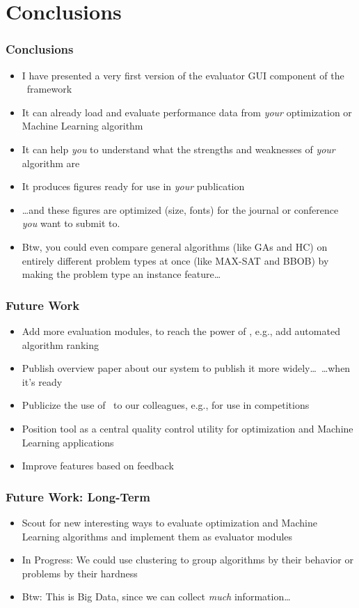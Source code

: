 %
\section{Conclusions}%
%
\begin{frame}%
\frametitle{Conclusions}%
\begin{itemize}%
\item I have presented a very first version of the evaluator GUI component of the \optimizationBenchmarking\ framework%
\item<2-> It can already load and evaluate performance data from \emph{your} optimization or Machine Learning algorithm%
\item<3-> It can help \emph{you} to understand what the strengths and weaknesses of \emph{your} algorithm are%
\item<4-> It produces figures ready for use in \emph{your} publication%
\item<5-> {\dots}and these figures are optimized (size, fonts) for the journal or conference \emph{you} want to submit to.%
\item<6-> Btw, you could even compare general algorithms (like GAs and HC) on entirely different problem types at once (like MAX-SAT and BBOB) by making the problem type an instance feature\dots%
\end{itemize}%
\end{frame}
%
%
\begin{frame}%
\frametitle{Future Work}%
\begin{itemize}%
\item Add more evaluation modules, to reach the power of \tspSuite\expandafter\scitep{\tspSuiteReferences}, e.g., add automated algorithm ranking%
\item<2-> Publish overview paper about our system to publish it more widely\dots\ {\dots}when it's ready%
\item<3-> Publicize the use of \optimizationBenchmarking\ to our colleagues, e.g., for use in competitions%
\item<4-> Position tool as a central quality control utility for optimization and Machine Learning applications%
\item<5-> Improve features based on feedback%
\end{itemize}%
\end{frame}
%
\begin{frame}%
\frametitle{Future Work: Long-Term}%
\begin{itemize}%
\item Scout for new interesting ways to evaluate optimization and Machine Learning algorithms and implement them as evaluator modules%
\item<2-> In Progress: We could use clustering to group algorithms by their behavior or problems by their hardness%
\item<3-> Btw: This is Big Data, since we can collect \emph{much} information\dots%
\end{itemize}%
\end{frame}%
%